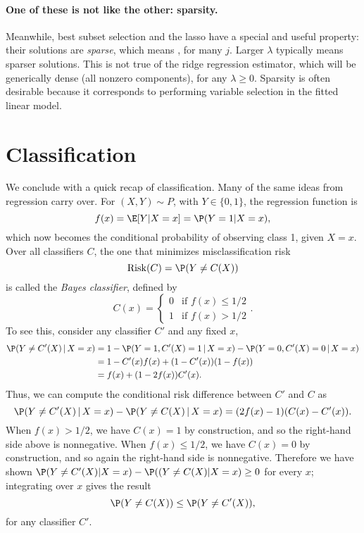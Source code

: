 \documentclass{article}
\begin{document}
\paragraph{One of these is not like the other: sparsity.}

Meanwhile, best subset selection and the lasso have a special and useful
property: their solutions \smash{$\hbeta$} are \emph{sparse}, which means
, for many $j$. Larger $\lambda$ typically means sparser
solutions. This is not true of the ridge regression estimator, which will be
generically dense (all nonzero components), for any $\lambda \geq 0$. Sparsity
is often desirable because it corresponds to performing variable selection in
the fitted linear model.

\section{Classification}

\def\hC{\hat{C}}
\def\hh{\hat{h}}

We conclude with a quick recap of classification. Many of the same ideas from
regression carry over. For $(X,Y) \sim P$, with $Y \in \{0,1\}$, the regression
function is 
\[
f(x) = \E[Y | X=x] = \P(Y=1 | X=x),
\]
which now becomes the conditional probability of observing class 1, given
$X=x$. Over all classifiers $C$, the one that minimizes misclassification risk 
\[
\Risk(C) = \P(Y \not= C(X))
\]
is called the \emph{Bayes classifier}, defined by 
\[
C(x) = 
\begin{cases}
0 & \text{if $f(x) \leq 1/2$} \\
1 & \text{if $f(x) > 1/2$}
\end{cases}.
\]
To see this, consider any classifier $C'$ and any fixed $x$,
\begin{align*}
\P(Y \not= C'(X) \,|\, X=x) 
&= 1 - \P(Y=1, C'(X)=1 \,|\, X=x) - \P(Y=0, C'(X)=0 \,|\, X=x) \\ 
&= 1 - C'(x) f(x) + (1 - C'(x))(1 - f(x)) \\
&= f(x) + (1 - 2f(x))C'(x).
\end{align*}
Thus, we can compute the conditional risk difference between $C'$ and $C$ as
\[
\P(Y \not= C'(X) \,|\, X=x) - \P(Y \not= C(X) \,|\, X=x) 
= (2f(x)-1)(C(x)-C'(x)).
\]
When $f(x)>1/2$, we have $C(x)=1$ by construction, and so the right-hand side
above is nonnegative. When $f(x) \leq 1/2$, we have $C(x)=0$ by construction,
and so again the right-hand side is nonnegative. Therefore we have shown
$\P(Y \not= C'(X) | X=x) - \P((Y \not= C(X) | X=x) \geq 0$ for every $x$;
integrating over $x$ gives the result 
\[
\P(Y \not= C(X)) \leq \P(Y \not= C'(X)),
\]
for any classifier $C'$. 
\end{document}
